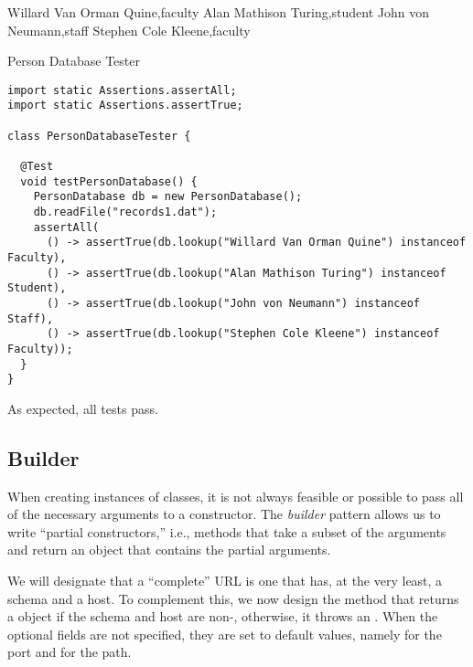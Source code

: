 \begin{verbnobox}[\small]
Willard Van Orman Quine,faculty
Alan Mathison Turing,student
John von Neumann,staff
Stephen Cole Kleene,faculty
\end{verbnobox}

\begin{cl}{Person Database Tester}
\begin{lstlisting}[language=MyJava]
import static Assertions.assertAll;
import static Assertions.assertTrue;

class PersonDatabaseTester {

  @Test
  void testPersonDatabase() {
    PersonDatabase db = new PersonDatabase();
    db.readFile("records1.dat");
    assertAll(
      () -> assertTrue(db.lookup("Willard Van Orman Quine") instanceof Faculty),
      () -> assertTrue(db.lookup("Alan Mathison Turing") instanceof Student),
      () -> assertTrue(db.lookup("John von Neumann") instanceof Staff),
      () -> assertTrue(db.lookup("Stephen Cole Kleene") instanceof Faculty));
  }
}
\end{lstlisting}
\end{cl}

As expected, all tests pass.

\subsection*{Builder}

When creating instances of classes, it is not always feasible or possible to pass all of the necessary arguments to a constructor. The \textit{builder} pattern allows us to write ``partial constructors,'' i.e., methods that take a subset of the arguments and return an object that contains the partial arguments. 


We will designate that a ``complete'' URL is one that has, at the very least, a schema and a host. To complement this, we now design the  method that returns a  object if the schema and host are non-, otherwise, it throws an . When the optional fields are not specified, they are set to default values, namely  for the port and  for the path.

